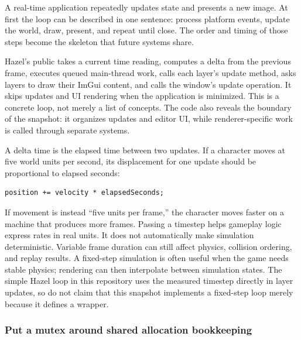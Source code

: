 \hypertarget{05-engine-i-ch013-give-the-application-a-clock-and-a-loop}{}

A real-time application repeatedly updates state and presents a new image. At first the loop can be described in one sentence: process platform events, update the world, draw, present, and repeat until close. The order and timing of those steps become the skeleton that future systems share.

Hazel's public  takes a current time reading, computes a delta from the previous frame, executes queued main-thread work, calls each layer's update method, asks layers to draw their ImGui content, and calls the window's update operation. It skips updates and UI rendering when the application is minimized. This is a concrete loop, not merely a list of concepts. The code also reveals the boundary of the snapshot: it organizes updates and editor UI, while renderer-specific work is called through separate systems.

A delta time is the elapsed time between two updates. If a character moves at five world units per second, its displacement for one update should be proportional to elapsed seconds:

\begin{verbatim}
position += velocity * elapsedSeconds;
\end{verbatim}

If movement is instead ``five units per frame,'' the character moves faster on a machine that produces more frames. Passing a timestep helps gameplay logic express rates in real units. It does not automatically make simulation deterministic. Variable frame duration can still affect physics, collision ordering, and replay results. A fixed-step simulation is often useful when the game needs stable physics; rendering can then interpolate between simulation states. The simple Hazel loop in this repository uses the measured timestep directly in layer updates, so do not claim that this snapshot implements a fixed-step loop merely because it defines a  wrapper.

\subsubsection{Put a mutex around shared allocation bookkeeping}\label{05-engine-i-ch013-put-a-mutex-around-shared-allocation-bookkeeping}

\hypertarget{05-engine-i-ch013-put-a-mutex-around-shared-allocation-bookkeeping}{}

